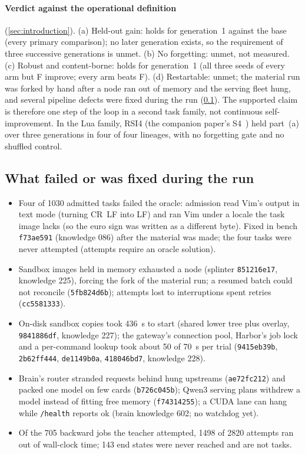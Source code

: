 \paragraph{Verdict against the operational definition} (\cref{sec:introduction}). (a) Held-out gain: holds for generation~1
against the base (every primary comparison); no later generation exists, so the requirement of three successive generations
is unmet. (b) No forgetting: unmet, not measured. (c) Robust and content-borne: holds for generation~1 (all three seeds of
every arm but F improve; every arm beats F). (d) Restartable: unmet; the material run was forked by hand after a node ran out
of memory and the serving fleet hung, and several pipeline defects were fixed during the run (\cref{sec:vim-failed}). The
supported claim is therefore one step of the loop in a second task family, not continuous self-improvement. In the Lua
family, RSI4 (the companion paper's S4~\cite{frontier2026}) held part~(a) over three generations in four of four lineages, with
no forgetting gate and no shuffled control.

\subsection{What failed or was fixed during the run}\label{sec:vim-failed}

\begin{itemize}
\item Four of 1030 admitted tasks failed the oracle: admission read Vim's output in text mode (turning CR~LF into LF) and ran
  Vim under a locale the task image lacks (so the euro sign was written as a different byte). Fixed in bench \texttt{f73ae591}
  (knowledge 086) after the material was made; the four tasks were never attempted (attempts require an oracle solution).
\item Sandbox images held in memory exhausted a node (splinter \texttt{851216e17}, knowledge 225), forcing the fork of the
  material run; a resumed batch could not reconcile (\texttt{5fb824d6b}); attempts lost to interruptions spent retries
  (\texttt{cc5581333}).
\item On-disk sandbox copies took 436~s to start (shared lower tree plus overlay, \texttt{9841886df}, knowledge 227); the
  gateway's connection pool, Harbor's job lock and a per-command lookup took about 50 of 70~s per trial (\texttt{9415eb39b},
  \texttt{2b62ff444}, \texttt{de1149b0a}, \texttt{418046bd7}, knowledge 228).
\item Brain's router stranded requests behind hung upstreams (\texttt{ae72fc212}) and packed one model on few cards
  (\texttt{b726c045b}); Qwen3 serving plans withdrew a model instead of fitting free memory (\texttt{f74314255}); a CUDA lane
  can hang while \texttt{/health} reports ok (brain knowledge 602; no watchdog yet).
\item Of the 705 backward jobs the teacher attempted, 1498 of 2820 attempts ran out of wall-clock time; 143 end states were
  never reached and are not tasks.
\end{itemize}

